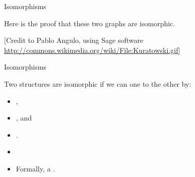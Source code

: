 \documentclass[11pt]{beamer}
\newcommand{\red}[1]{{\color{red}{#1}}}
\newcommand{\blue}[1]{{\color{blue}{#1}}}
\begin{document}
\begin{frame}{Isomorphisms}

\vfill

Here is the proof that these two graphs are isomorphic.

\begin{center}
\end{center}

\vfill\footnotesize{[Credit to Pablo Angulo, using Sage software
    \url{http://commons.wikimedia.org/wiki/File:Kuratowski.gif}]}
\end{frame}

\begin{frame}{Isomorphisms}
\vfill

Two structures are isomorphic if we can \blue{morph} one to the
other by:
\begin{itemize}
\vfill\item \blue{bending},
\vfill\item \blue{shrinking}, and
\vfill\item \blue{expanding}.
\vfill\item \red{No cutting; no gluing}
\vfill\item Formally, a \red{homotopy}.
\end{itemize}
\vfill
\end{frame}
\end{document}
